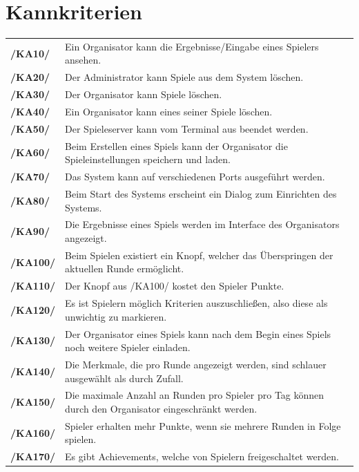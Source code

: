 \documentclass[a4paper]{scrreprt}
\begin{document}
\section{Kannkriterien}
\begin{tabularx}{\linewidth}{@{}>{\bfseries}l@{\hspace{.5em}}X@{}} %
/KA10/ & Ein \Gls{Organisator} kann die Ergebnisse/Eingabe eines Spielers ansehen. \\
/KA20/ & Der \Gls{Administrator} kann Spiele aus dem System löschen. \\
/KA30/ & Der \Gls{Organisator} kann Spiele löschen. \\
/KA40/ & Ein \Gls{Organisator} kann eines seiner \Gls{Spiele} löschen. \\
/KA50/ & Der \Gls{Spieleserver} kann vom Terminal aus beendet werden. \\
/KA60/ & Beim Erstellen eines Spiels kann der \Gls{Organisator} die \Gls{Spieleinstellungen} speichern und laden. \\
/KA70/ & Das System kann auf verschiedenen Ports ausgeführt werden. \\
/KA80/ & Beim Start des Systems erscheint ein Dialog zum Einrichten des Systems. \\
/KA90/ & Die Ergebnisse eines \Gls{Spiel}s werden im Interface des \Gls{Organisator}s angezeigt. \\
/KA100/ & Beim Spielen existiert ein Knopf, welcher das Überspringen der aktuellen Runde ermöglicht. \\
/KA110/ & Der Knopf aus /KA100/ kostet den \Gls{Spieler} Punkte. \\ %
/KA120/ & Es ist \Gls{Spieler}n möglich Kriterien auszuschließen, also diese als unwichtig zu markieren. \\
/KA130/ & Der \Gls{Organisator} eines Spiels kann nach dem Begin eines Spiels noch weitere Spieler einladen. \\
/KA140/ & Die Merkmale, die pro Runde angezeigt werden, sind schlauer ausgewählt als durch Zufall. \\ %
/KA150/ & Die maximale Anzahl an Runden pro Spieler pro Tag können durch den \Gls{Organisator} eingeschränkt werden. \\
/KA160/ & \Gls{Spieler} erhalten mehr Punkte, wenn sie mehrere Runden in Folge spielen. \\
/KA170/ & Es gibt \Gls{Achievement}s, welche von Spielern freigeschaltet werden. \\

\end{tabularx}
\end{document}
